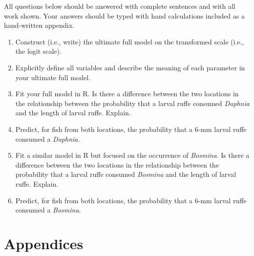 \documentclass[10pt,openany]{book}\usepackage[]{graphicx}\usepackage[]{color}
\begin{document}
\begin{hwsection}{All questions below should be answered with complete sentences and with all work shown.  Your answers should be typed with hand calculations included as a hand-written appendix.}
    \begin{enumerate}
      \item Construct (i.e., write) the ultimate full model on the transformed scale (i.e., the logit scale).
      \item Explicitly define all variables and describe the meaning of each parameter in your ultimate full model.
      \item Fit your full model in R.  Is there a difference between the two locations in the relationship between the probability that a larval ruffe consumed \emph{Daphnia} and the length of larval ruffe.  Explain.
      \item Predict, for fish from both locations, the probability that a 6-mm larval ruffe consumed a \emph{Daphnia}.
      \item Fit a similar model in R but focused on the occurrence of \emph{Bosmina}.  Is there a difference between the two locations in the relationship between the probability that a larval ruffe consumed \emph{Bosmina} and the length of larval ruffe.  Explain.
      \item Predict, for fish from both locations, the probability that a 6-mm larval ruffe consumed a \emph{Bosmina}.
    \end{enumerate}

\end{hwsection}

    \cleardoublepage
    \chapter*{Appendices}
    \appendix
      

  \backmatter
    \cleardoublepage
\end{document}
